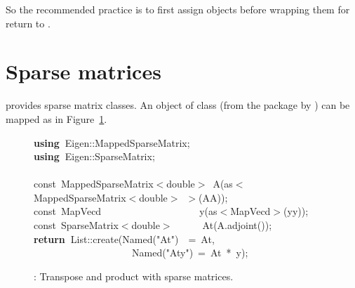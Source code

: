 \documentclass[shortnames,article]{jss}
\newcommand{\hlstd}[1]{\textcolor[rgb]{0,0,0}{#1}}
\newcommand{\hlopt}[1]{\textcolor[rgb]{0,0,0}{#1}}
\newcommand{\hlstr}[1]{\textcolor[rgb]{0.90,0.15,0.15}{#1}}
\newcommand{\hlkwa}[1]{\textcolor[rgb]{0.61,0.13,0.93}{\bf{#1}}}
\newcommand{\hlkwb}[1]{\textcolor[rgb]{0.13,0.54,0.13}{#1}}
\newcommand{\hlkwd}[1]{\textcolor[rgb]{0,0,0}{#1}}
\begin{document}
So the recommended practice is to first assign objects before wrapping them
for return to .

\section{Sparse matrices}
\label{sec:sparse}

 provides sparse matrix classes.  An  object of
class  (from the  package by
\citet{CRAN:Matrix}) can be mapped as in Figure~\ref{sparseProd}.

\begin{figure}[htb]
  \noindent
  \ttfamily
  \hlstd{}\hlkwa{using\ }\hlstd{Eigen}\hlopt{::}\hlstd{MappedSparseMatrix}\hlopt{;}\hspace*{\fill}\\
  \hlstd{}\hlkwa{using\ }\hlstd{Eigen}\hlopt{::}\hlstd{SparseMatrix}\hlopt{;}\hspace*{\fill}\\
  \hlstd{}\hspace*{\fill}\\
  \hlkwb{const\ }\hlstd{MappedSparseMatrix}\hlopt{$<$}\hlstd{}\hlkwb{double}\hlstd{}\hlopt{$>$\ }\hlstd{}\hlkwd{A}\hlstd{}\hlopt{(}\hlstd{as}\hlopt{$<$}\hlstd{MappedSparseMatrix}\hlopt{$<$}\hlstd{}\hlkwb{double}\hlstd{}\hlopt{$>$\ $>$(}\hlstd{AA}\hlopt{));}\hspace*{\fill}\\
  \hlstd{}\hlkwb{const\ }\hlstd{MapVecd}\hlstd{\ \ \ \ \ \ \ \ \ \ \ \ \ \ \ \ \ \ \ \ }\hlstd{}\hlkwd{y}\hlstd{}\hlopt{(}\hlstd{as}\hlopt{$<$}\hlstd{MapVecd}\hlopt{$>$(}\hlstd{yy}\hlopt{));}\hspace*{\fill}\\
  \hlstd{}\hlkwb{const\ }\hlstd{SparseMatrix}\hlopt{$<$}\hlstd{}\hlkwb{double}\hlstd{}\hlopt{$>$}\hlstd{\ \ \ \ \ \ }\hlopt{}\hlstd{}\hlkwd{At}\hlstd{}\hlopt{(}\hlstd{A}\hlopt{.}\hlstd{}\hlkwd{adjoint}\hlstd{}\hlopt{());}\hspace*{\fill}\\
  \hlstd{}\hlkwa{return\ }\hlstd{List}\hlopt{::}\hlstd{}\hlkwd{create}\hlstd{}\hlopt{(}\hlstd{Named}\hlopt{{(}}\hlstd{}\hlstr{"At"}\hlstd{}\hlopt{{)}}\hlstd{\ \ }\hlopt{=\ }\hlstd{At}\hlopt{,}\hspace*{\fill}\\
  \hlstd{}\hlstd{\ \ \ \ \ \ \ \ \ \ \ \ \ \ \ \ \ \ \ \ }\hlstd{Named}\hlopt{{(}}\hlstd{}\hlstr{"Aty"}\hlstd{}\hlopt{{)}\ =\ }\hlstd{At\ }\hlopt{{*}\ }\hlstd{y}\hlopt{);}\hlstd{}\hspace*{\fill}\\
  \mbox{}
  \normalfont
  \normalsize
  \caption{: Transpose and product with sparse matrices.}
  \label{sparseProd}
\end{figure}
\end{document}
